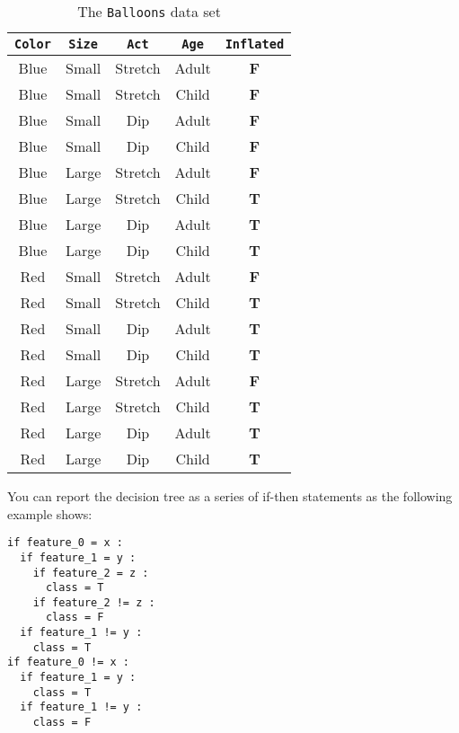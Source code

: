 \begin{enumerate}
\begin{enumerate}
    \begin{table}[h]
    \centering
    \begin{tabular}[h]{|c|c|c|c|c|}
      \hline
      \texttt{Color} & \texttt{Size} & \texttt{Act} & \texttt{Age} & \texttt{Inflated} \\
      \hline
      Blue      & Small      & Stretch   & Adult     & {\bf F}        \\
      Blue       & Small      & Stretch   & Child     & {\bf F}        \\
      Blue       & Small      & Dip       & Adult     & {\bf F}        \\
      Blue       & Small      & Dip       & Child     & {\bf F}        \\
      Blue       & Large      & Stretch   & Adult     & {\bf F}        \\
      Blue       & Large      & Stretch   & Child     & {\bf T}        \\
      Blue       & Large      & Dip       & Adult     & {\bf T}        \\
      Blue       & Large      & Dip       & Child     & {\bf T}        \\
      Red      & Small      & Stretch   & Adult     & {\bf F}        \\
      Red      & Small      & Stretch   & Child     & {\bf T}        \\
      Red      & Small      & Dip       & Adult     & {\bf T}        \\
      Red      & Small      & Dip       & Child     & {\bf T}        \\
      Red      & Large      & Stretch   & Adult     & {\bf F}        \\
      Red      & Large      & Stretch   & Child     & {\bf T}        \\
      Red      & Large      & Dip       & Adult     & {\bf T}        \\
      Red      & Large      & Dip       & Child     & {\bf T}        \\
      \hline
    \end{tabular}
    \caption{The {\tt Balloons} data set}
    \label{tab:Balloons}
  \end{table}
  
  You can report the decision tree as a series of if-then statements as the following
example shows:
  
  \begin{verbatim}
if feature_0 = x :
  if feature_1 = y :
    if feature_2 = z :
      class = T
    if feature_2 != z :
      class = F
  if feature_1 != y :
    class = T
if feature_0 != x :
  if feature_1 = y :
    class = T
  if feature_1 != y :
    class = F
\end{verbatim}


\end{enumerate}
\end{enumerate}
